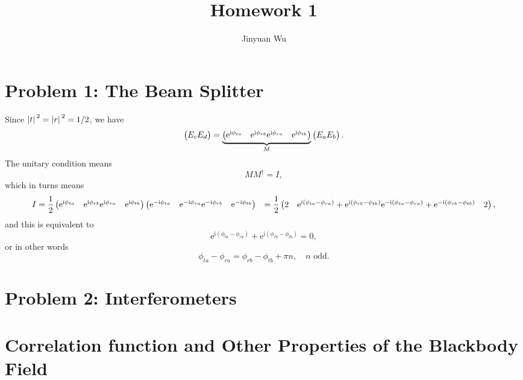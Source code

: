 \documentclass[hyperref, a4paper]{article}
\title{Homework 1}
\author{Jinyuan Wu}
\newcommand*{\ii}{\mathrm{i}}
\newcommand*{\ee}{\mathrm{e}}
\def\\{}%
\begin{document}
\maketitle 

\section{Problem 1: The Beam Splitter}

Since $\abs*{t}^2 = \abs*{r}^2 = 1/2$,
we have 
\begin{equation}
    \pmqty{E_c \\ E_d} = 
    \underbrace{
        \pmqty{
        \ee^{\ii \phi_{ta}} & \ee^{\ii \phi_{rb}} \\
        \ee^{\ii \phi_{ra}} & \ee^{\ii \phi_{tb}} 
        }
    }_M \pmqty{E_{a} \\ E_b}.
\end{equation}
The unitary condition means 
\begin{equation}
    M M^\dagger = I,
\end{equation}
which in turns means 
\[
    \begin{aligned}
        I &= \frac{1}{2} \pmqty{
            \ee^{\ii \phi_{ta}} & \ee^{\ii \phi_{rb}} \\
            \ee^{\ii \phi_{ra}} & \ee^{\ii \phi_{tb}} 
        } 
        \pmqty{
            \ee^{- \ii \phi_{ta}} & \ee^{-\ii \phi_{ra}} \\
            \ee^{- \ii \phi_{rb}} & \ee^{-\ii \phi_{tb}} 
        } \\ 
        &= \frac{1}{2} \pmqty{
            2 & \ee^{\ii (\phi_{ta} - \phi_{ra})} + \ee^{\ii (\phi_{rb} - \phi_{tb})} \\
            \ee^{- \ii (\phi_{ta} - \phi_{ra})} + \ee^{- \ii (\phi_{rb} - \phi_{tb})} & 2
        },
    \end{aligned}
\]
and this is equivalent to 
\[
    \ee^{\ii (\phi_{ta} - \phi_{ra})} + \ee^{\ii (\phi_{rb} - \phi_{tb})} = 0,
\]
or in other words 
\begin{equation}
    \phi_{ta} - \phi_{ra} = \phi_{rb} - \phi_{tb} + \pi n, \quad \text{$n$ odd}.
\end{equation}

\section{Problem 2: Interferometers}



\section{Correlation function and Other Properties of the Blackbody Field}
\end{document}
